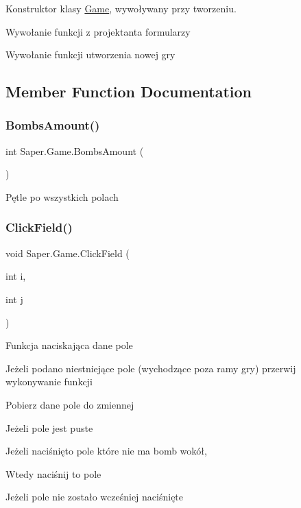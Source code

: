 Konstruktor klasy \mbox{\hyperlink{class_saper_1_1_game}{Game}}, wywoływany przy tworzeniu. 

Wywołanie funkcji z projektanta formularzy

Wywołanie funkcji utworzenia nowej gry 

\subsection{Member Function Documentation}
\mbox{\label{class_saper_1_1_game_a68a874323b134ee545e72de1d332f11a}} 
\subsubsection{\texorpdfstring{BombsAmount()}{BombsAmount()}}
{\footnotesize\ttfamily int Saper.\+Game.\+Bombs\+Amount (\begin{DoxyParamCaption}{ }\end{DoxyParamCaption})}

Pętle po wszystkich polach \mbox{\label{class_saper_1_1_game_a87c8f7562e380781913a182aab6e093d}} 
\subsubsection{\texorpdfstring{ClickField()}{ClickField()}}
{\footnotesize\ttfamily void Saper.\+Game.\+Click\+Field (\begin{DoxyParamCaption}\item[{int}]{i,  }\item[{int}]{j }\end{DoxyParamCaption})}

Funkcja naciskająca dane pole

Jeżeli podano niestniejące pole (wychodzące poza ramy gry) przerwij wykonywanie funkcji

Pobierz dane pole do zmiennej

Jeżeli pole jest puste

Jeżeli naciśnięto pole które nie ma bomb wokół,

Wtedy naciśnij to pole

Jeżeli pole nie zostało wcześniej naciśnięte

